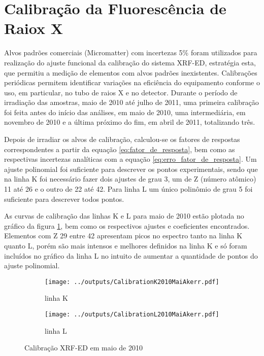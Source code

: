 \section{Calibração da Fluorescência de Raiox X}

Alvos padrões comerciais (Micromatter) com incertezas 5\% foram utilizados para 
realização do ajuste funcional da calibração do sistema XRF-ED, estratégia esta, 
que permitiu a medição de elementos com alvos padrões inexistentes. Calibrações 
periódicas permitem identificar variações na eficiência do equipamento conforme 
o uso, em particular, no tubo de raios X e no detector. Durante o período de 
irradiação das amostras, maio de 2010 até julho de 2011, uma primeira calibração 
foi feita antes do início das análises, em maio de 2010, uma intermediária, 
em novembro de 2010 e a última próximo do fim, em abril de 2011, totalizando três. 

Depois de irradiar os alvos de calibração, calculou-se os fatores de respostas 
correspondentes a partir da equação \ref{eq:fator_de_resposta}, bem como as 
respectivas incertezas analíticas com a equação \ref{eq:erro_fator_de_resposta}.
Um ajuste polinomial foi suficiente para descrever os pontos experimentais,
sendo que na linha K foi necessário fazer dois ajustes de grau 3, um de Z 
(número atômico) 11 até 26 e o outro de 22 até 42. Para linha L um único 
polinômio de grau 5 foi suficiente para descrever todos pontos.

As curvas de calibração das linhas K e L para maio de 2010 estão plotada no 
gráfico da figura \ref{fig:edx_calib_KLmaio2010}, bem como os respectivos 
ajustes e coeficientes encontrados. Elementos com Z 29 entre 42 apresentam
picos no espectro tanto na linha K quanto L, porém são mais intensos e melhores
definidos na linha K e só foram incluídos no gráfico da linha L no intuito de 
aumentar a quantidade de pontos do ajuste polinomial.

\newpage
\begin{figure}[H]
  \begin{subfigure}[b]{0.5\textwidth}
    \texttt{[image: ../outputs/CalibrationK2010MaiAkerr.pdf]}
    \caption{linha K}
  \end{subfigure}%
  \begin{subfigure}[b]{0.5\textwidth}
    \texttt{[image: ../outputs/CalibrationL2010MaiAkerr.pdf]}
    \caption{linha L}
  \end{subfigure}
  \caption{Calibração XRF-ED em maio de 2010 \label{fig:edx_calib_KLmaio2010}}
\end{figure}

